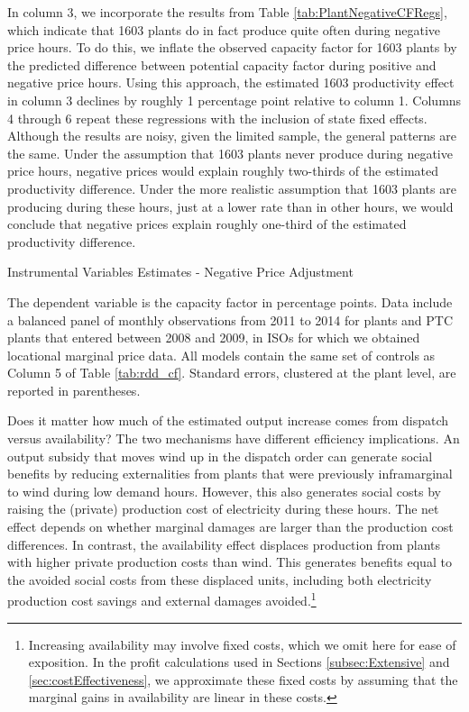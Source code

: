 \documentclass[12pt]{article}
\begin{document}
In column 3, we incorporate the results from Table \ref{tab:PlantNegativeCFRegs}, which indicate that 1603 plants do in fact produce quite often during negative price hours. To do this, we inflate the observed capacity factor for 1603 plants by the predicted difference between potential capacity factor during positive and negative price hours. Using this approach, the estimated 1603 productivity effect in column 3 declines by roughly 1 percentage point relative to column 1. Columns 4 through 6 repeat these regressions with the inclusion of state fixed effects. Although the results are noisy, given the limited sample, the general patterns are the same. Under the assumption that 1603 plants never produce during negative price hours, negative prices would explain roughly two-thirds of the estimated productivity difference. Under the more realistic assumption that 1603 plants are producing during these hours, just at a lower rate than in other hours, we would conclude that negative prices explain roughly one-third of the estimated productivity difference.


\begin{table}[h]
  \caption{Instrumental Variables Estimates - Negative Price Adjustment \label{tab:rdd_cf_negative}}
  \begin{center} {\footnotesize{}} \end{center}
  \footnotesize
  The dependent variable is the capacity factor in percentage points. Data include a balanced panel of monthly observations from 2011 to 2014 for   plants and  \unskip PTC plants that entered between 2008 and 2009, in ISOs for which we obtained locational marginal price data. All models contain the same set of controls as Column 5 of Table \ref{tab:rdd_cf}. Standard errors, clustered at the plant level, are reported in parentheses.
\end{table}

Does it matter how much of the estimated output increase comes from dispatch versus availability? The two mechanisms have different efficiency implications. An output subsidy that moves wind up in the dispatch order can generate social benefits by reducing externalities from plants that were previously inframarginal to wind during low demand hours. However, this also generates social costs by raising the (private) production cost of electricity during these hours. The net effect depends on whether marginal damages are larger than the production cost differences. In contrast, the availability effect displaces production from plants with higher private production costs than wind. This generates benefits equal to the avoided social costs from these displaced units, including both electricity production cost savings and external damages avoided.\footnote{Increasing availability may involve fixed costs, which we omit here for ease of exposition. In the profit calculations used in Sections \ref{subsec:Extensive} and \ref{sec:costEffectiveness}, we approximate these fixed costs by assuming that the marginal gains in availability are linear in these costs.}
\end{document}
